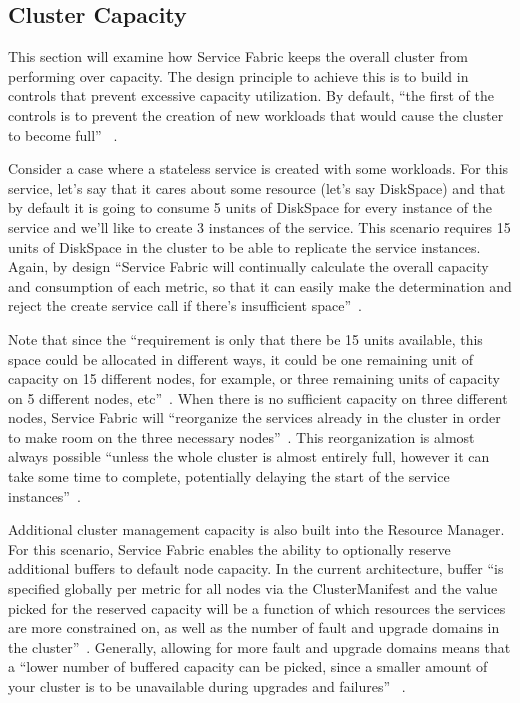 \subsection{Cluster Capacity}
This section will examine how Service Fabric keeps the overall cluster
from performing over capacity. The design principle to achieve this
is to build in controls that prevent excessive capacity utilization. 
By default, ``the first of the controls is to prevent the creation
of new workloads that would cause the cluster to become full''
~\cite{hid-sp18-501-fig2and3}.

Consider a case where a stateless service is created with some
workloads.  For this service, let's say that it cares about some
resource (let’s say DiskSpace) and that by default it is going to
consume 5 units of DiskSpace for every instance of the service and
we'll like to create 3 instances of the service. This scenario
requires 15 units of DiskSpace in the cluster to be able to replicate
the service instances.  Again, by design ``Service Fabric will 
continually
calculate the overall capacity and consumption of each metric, so that
it can easily make the determination and reject the create service
call if there's insufficient space''~\cite{hid-sp18-501-fig2and3}.

Note that since the ``requirement is only that there be 15 units
available, this space could be allocated in different ways, it could
be one remaining unit of capacity on 15 different nodes, for example,
or three remaining units of capacity on 5 different nodes, 
etc''~\cite{hid-sp18-501-description}. 
When there is no sufficient capacity on three different nodes, Service
Fabric will ``reorganize the services already in the cluster in order to
make room on the three necessary nodes''~\cite{hid-sp18-501-description}. 
This reorganization is almost
always possible ``unless the whole cluster is almost entirely full,
however it can take some time to complete, potentially delaying the
start of the service instances''~\cite{hid-sp18-501-description}.

Additional cluster management capacity is also built into the Resource
Manager. For this scenario, Service Fabric enables the ability to
optionally reserve additional buffers to default node capacity. In the
current architecture, buffer ``is specified globally per metric for
all nodes via the ClusterManifest and the value picked for the
reserved capacity will be a function of which resources the services
are more constrained on, as well as the number of fault and upgrade
domains in the cluster''~\cite{hid-sp18-501-description}. Generally,
allowing for more fault and upgrade domains means that a ``lower
number of buffered capacity can be picked, since a smaller amount of
your cluster is to be unavailable during upgrades and failures''
~\cite{hid-sp18-501-description}.

